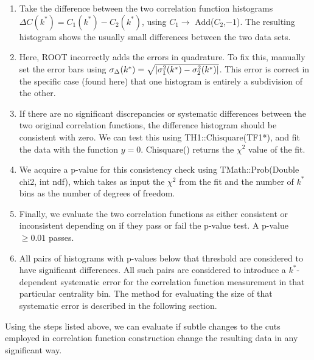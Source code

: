 \begin{enumerate}
\item Take the difference between the two correlation function histograms $\Delta C(k^*) = C_1(k^*) - C_2(k^*)$, using $C_1\rightarrow$ Add($C_2$,$-1$).  The resulting histogram shows the usually small differences between the two data sets.
\item Here, ROOT incorrectly adds the errors in quadrature.  To fix this, manually set the error bars using $\sigma_{\Delta}(k^*) = \sqrt{ \left\lvert \sigma_1^2(k^*) - \sigma_2^2(k^*) \right\rvert}$.  This error is correct in the specific case (found here) that one histogram is entirely a subdivision of the other.
\item If there are no significant discrepancies or systematic differences between the two original correlation functions, the difference histogram should be consistent with zero.  We can test this using TH1::Chisquare(TF1*), and fit the data with the function $y=0$.  Chisquare() returns the $\chi^2$ value of the fit.
\item We acquire a p-value for this consistency check using TMath::Prob(Double chi2, int ndf), which takes as input the $\chi^2$ from the fit and the number of $k^*$ bins as the number of degrees of freedom.  
\item Finally, we evaluate the two correlation functions as either consistent or inconsistent depending on if they pass or fail the p-value test.  A p-value $\geq 0.01$ passes.  
\item All pairs of histograms with p-values below that threshold are considered to have significant differences.  All such pairs are considered to introduce a $k^*$-dependent systematic error for the correlation function measurement in that particular centrality bin.  The method for evaluating the size of that systematic error is described in the following section.
\end{enumerate}

Using the steps listed above, we can evaluate if subtle changes to the cuts employed in correlation function construction change the resulting data in any significant way.  


